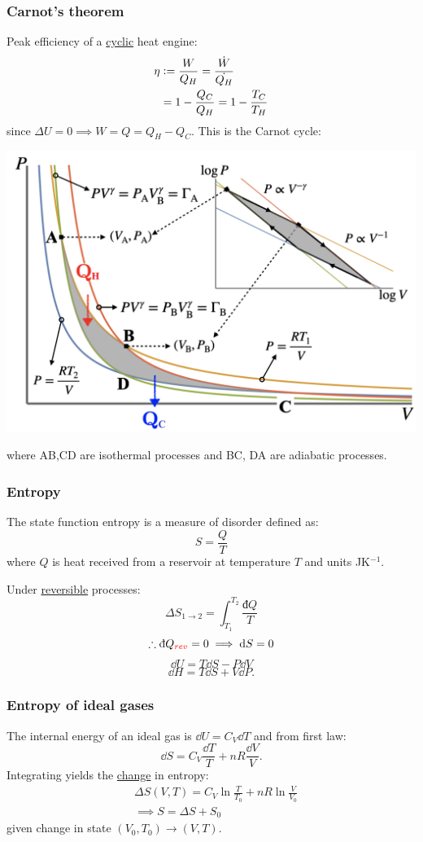\documentclass{article}
\newcommand{\deq}{\vcentcolon=}
\newcommand{\idd}{\text{đ}}
\begin{document}
\begin{multicols*}{3}
\subsubsection*{Carnot's theorem}
Peak efficiency of a \underline{cyclic}
heat engine:
\begin{align*}
    \eta&\deq\frac{W}{Q_H}
    =\frac{\dot{W}}{\dot{Q_H}} \\
    &=1-\frac{Q_C}{Q_H}=1-\frac{T_C}{T_H}
\end{align*}
since $\Delta U=0
\implies W=Q=Q_H-Q_C$.
This is the Carnot cycle:
\begin{center}
    \includegraphics*[scale=0.13]{f0.png}
\end{center}
where AB,CD are isothermal processes
and BC, DA are adiabatic processes.

\subsubsection*{Entropy}
The state function entropy is a measure
of disorder defined as:
$$S=\frac{Q}{T}$$
where $Q$ is heat received from a reservoir
at temperature $T$
and units JK$^{-1}$.

Under \underline{reversible} processes:
$$\Delta S_{1\rightarrow2}
=\int_{T_1}^{T_2}\frac{\idd Q}{T}$$
$$\therefore \idd Q_{\textcolor{red}{rev}}
=0\implies \dd S=0$$
$$\dd U=T\dd S-P\dd V$$
$$\dd H=T\dd S+V\dd P.$$

\subsubsection*{Entropy of ideal gases}
The internal energy of an ideal gas is
$\dd U=C_V\dd T$ and from first law:
$$\dd S=C_V\frac{\dd T}{T}
+nR\frac{\dd V}{V}.$$
Integrating yields the
\underline{change} in entropy:
\begin{align*}
    &\Delta S(V,T)
    =C_V\ln\frac{T}{T_0}
    +nR\ln\frac{V}{V_0} \\
    &\implies
    S=\Delta S+S_0
\end{align*}
given change in state
$(V_0,T_0)\rightarrow(V,T)$.


\end{multicols*}
\end{document}
